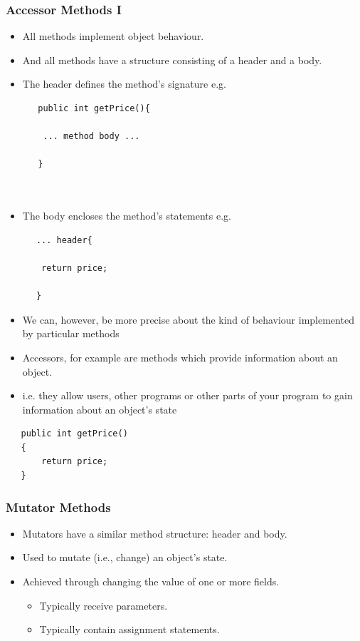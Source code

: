 \documentclass{beamer}
\begin{document}
\begin{frame}[fragile]
\frametitle{Accessor Methods I}
\begin{itemize}
\item All methods implement object behaviour.
\item And all methods have a structure consisting of a header and a body.
\item The header defines the \alert{method’s signature} e.g.   
\begin{lstlisting}
   public int getPrice()‏{
	
	... method body ...

   }

 
\end{lstlisting}

\item The body encloses the method’s statements e.g.
\end{itemize}
\begin{lstlisting}
      ... header{

	   return price;

      }
\end{lstlisting}
\end{frame}

\begin{frame}[fragile]
\begin{itemize}
\item We can, however, be more precise about the kind of behaviour implemented by particular methods
\item \alert{Accessors}, for example are methods which provide information about an object.
\item i.e. they allow users, other programs or other parts of your program to gain information about an object's state
\end{itemize}
\begin{lstlisting}
   public int getPrice()‏
   {
       return price;
   } 
\end{lstlisting}
\end{frame}

\begin{frame}
\frametitle{Mutator Methods}
\begin{itemize}
\item \alert{Mutators} have a similar method structure: header and body.
\item Used to \alert{mutate} (i.e., change) an object’s state.
\item Achieved through changing the value of one or more fields.
\begin{itemize}
\item Typically receive parameters.
\item Typically contain assignment statements.
\end{itemize}
\end{itemize}
\end{frame}
\end{document}
